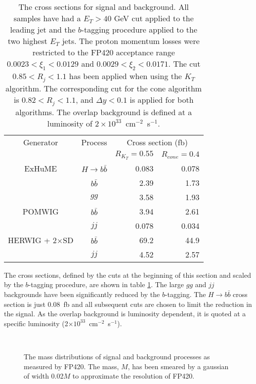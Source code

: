\begin{table}[tdp]
\centering
\begin{tabular}{|c|c|r|r|}
\hline
Generator & Process & \multicolumn{2}{c|}{Cross section (fb)} \\
& & $R_{K_T}=0.55$ & $R_{cone}=0.4$ \\
\hline
ExHuME & $H\rightarrow b\bar{b}$ & 0.083 & 0.078 \\
 &$b\bar{b}$ & 2.39 & 1.73 \\
 & $gg$ & 3.58 & 1.93\\
POMWIG & $b\bar{b}$ & 3.94 & 2.61\\
& $jj$ & 0.078 & 0.034\\
HERWIG + 2$\times$SD & $b\bar{b}$ & 69.2 & 44.9\\
& $jj$ & 4.52 & 2.57 \\   
\hline
\end{tabular}
\caption[Cross sections of $H\rightarrow b\bar{b}$ and backgrounds after kinematic matching cuts]{The cross sections for signal and background. All samples have had a $E_T > 40$ GeV cut applied to the leading jet and the $b$-tagging procedure applied to the two highest $E_T$ jets. The proton momentum losses were restricted to the FP420 acceptance range  $0.0023<\xi_1<0.0129$ and $0.0029<\xi_2<0.0171$. The cut $0.85<R_j<1.1$ has been applied when using the $K_T$ algorithm. The corresponding cut for the cone algorithm is $0.82<R_j<1.1$, and $\Delta y<0.1$ is applied for both algorithms. The overlap background is defined at a luminosity of $2\times10^{33}$~cm$^{-2}$~s$^{-1}$.\label{inputxs}}
\end{table}%

The cross sections, defined by the cuts at the beginning of this section and scaled by the $b$-tagging procedure, are shown in table \ref{inputxs}. The large $gg$ and $jj$ backgrounds have been significantly reduced by the $b$-tagging. 
The $H\rightarrow b\bar{b}$ cross section is just 0.08~fb and all subsequent cuts are chosen to limit the reduction in the signal. As the overlap background is luminosity dependent, it is quoted at a specific luminosity (2$\times10^{33}$~cm$^{-2}$~s$^{-1}$).

\begin{figure}
\centering
\mbox{
	}
\caption[The simulated mass distributions of signal and background processes as measured by FP420]{The mass distributions of signal and background processes as measured by FP420. The mass, $M$, has been smeared by a gaussian of width 0.02$M$ to approximate the resolution of FP420. 
\label{massafterkinematics}}
\end{figure}

